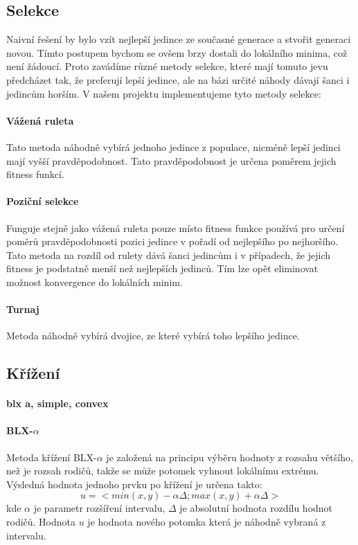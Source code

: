 \documentclass[a4paper,11pt]{scrartcl}
\begin{document}
\subsection{Selekce}
Naivní řešení by bylo vzít nejlepší jedince ze současné generace a stvořit generaci novou. Tímto postupem bychom se ovšem brzy dostali do lokálního minima, což není žádoucí. Proto zavádíme různé metody selekce, které mají tomuto jevu předcházet tak, že preferují lepší jedince, ale na bázi určité náhody dávají šanci i jedincům horším. V našem projektu implementujeme tyto metody selekce:

\paragraph{Vážená ruleta}
Tato metoda náhodně vybírá jednoho jedince z populace, nicméně lepší jedinci mají vyšší pravděpodobnost. Tato pravděpodobnost je určena poměrem jejich fitness funkcí.

\paragraph{Poziční selekce}
Funguje stejně jako vážená ruleta pouze místo fitness funkce používá pro určení poměrů pravděpodobnosti pozici jedince v pořadí od nejlepšího po nejhoršího. Tato metoda na rozdíl od rulety dává šanci jedincům i v případech, že jejich fitness je podstatně menší než nejlepších jedinců. Tím lze opět eliminovat možnost konvergence do lokálních minim.

\paragraph{Turnaj}
Metoda náhodně vybírá dvojice, ze které vybírá toho lepšího jedince.

\subsection{Křížení}

\paragraph{blx a, simple, convex}

\paragraph{BLX-$\alpha$}
Metoda křížení BLX-$\alpha$ je založená na principu výběru hodnoty z rozsahu většího, než je rozsah rodičů, takže se může potomek vyhnout lokálnímu extrému.\\
Výsledná hodnota jednoho prvku po křížení je určena takto:
\begin{equation}
    u = <min(x,y) - \alpha \Delta; max(x,y) + \alpha \Delta>
\end{equation}
kde $\alpha$ je parametr rozšíření intervalu, $\Delta$ je absolutní hodnota rozdílu hodnot rodičů. Hodnota $u$ je hodnota nového potomka která je náhodně vybraná z intervalu.
\end{document}
